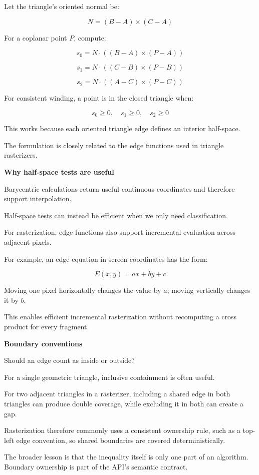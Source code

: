Let the triangle's oriented normal be:

\[
N=(B-A)\times(C-A)
\]

For a coplanar point \(P\), compute:

\[
s_0=N\cdot((B-A)\times(P-A))
\]

\[
s_1=N\cdot((C-B)\times(P-B))
\]

\[
s_2=N\cdot((A-C)\times(P-C))
\]

For consistent winding, a point is in the closed triangle when:

\[
s_0\ge0,\quad s_1\ge0,\quad s_2\ge0
\]

This works because each oriented triangle edge defines an interior half-space.

The formulation is closely related to the edge functions used in triangle rasterizers.

\textbf{Why half-space tests are useful}

Barycentric calculations return useful continuous coordinates and therefore support interpolation.

Half-space tests can instead be efficient when we only need classification.

For rasterization, edge functions also support incremental evaluation across adjacent pixels.

For example, an edge equation in screen coordinates has the form:

\[
E(x,y)=ax+by+c
\]

Moving one pixel horizontally changes the value by \(a\); moving vertically changes it by \(b\).

This enables efficient incremental rasterization without recomputing a cross product for every fragment.

\textbf{Boundary conventions}

Should an edge count as inside or outside?

For a single geometric triangle, inclusive containment is often useful.

For two adjacent triangles in a rasterizer, including a shared edge in both triangles can produce double coverage, while excluding it in both can create a gap.

Rasterization therefore commonly uses a consistent ownership rule, such as a top-left edge convention, so shared boundaries are covered deterministically.

The broader lesson is that the inequality itself is only one part of an algorithm. Boundary ownership is part of the API's semantic contract.

